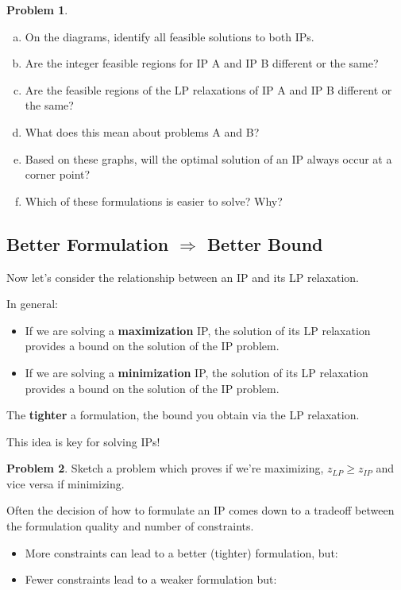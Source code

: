 \documentclass[11pt]{article}
\theoremstyle{definition}
\newtheorem{problem}{Problem}
\newcommand{\answerbox}[3]{%
  \fbox{%
    \begin{minipage}[#1]{#2}
      \hfill\vspace{#3}
    \end{minipage}
  }
}
\newcommand{\wordbox}{\answerbox{c}{1.2in}{.7cm}}
\begin{document}
\begin{problem}
\newpage

\begin{enumerate}[(a)]
   \item On the diagrams, identify all feasible solutions to both IPs. \vfill
   \item Are the integer feasible regions for IP A and IP B different or the same? \vfill
   \item Are the feasible regions of the LP relaxations of IP A and IP B different or the same? \vfill
   \item What does this mean about problems A and B? \vfill
   \item Based on these graphs, will the optimal solution of an IP always occur at a corner point? \vfill
   \item Which of these formulations is easier to solve? Why? \vfill

\end{enumerate}
\end{problem}

\newpage

\subsection{Better Formulation $\Rightarrow$ Better Bound}

Now let's consider the relationship between an IP and its LP relaxation.

\bigskip

In general:
	\begin{itemize}
	\item If we are solving a \textbf{maximization} IP, the solution of its LP relaxation provides a \wordbox bound on the solution of the IP problem.
	\item If we are solving a \textbf{minimization} IP, the solution of its LP relaxation provides a \wordbox bound on the solution of the IP problem.
	\end{itemize}

The \textbf{tighter} a formulation, the \wordbox bound you obtain via the LP relaxation.

\begin{tcolorbox}
This idea is key for solving IPs!
\end{tcolorbox}	
\begin{problem}
Sketch a problem which proves if we're maximizing, $z_{LP} \geq z_{IP}$ and vice versa if minimizing.
\end{problem}
\vfill

Often the decision of how to formulate an IP comes down to a tradeoff between the formulation quality and number of constraints.
\begin{itemize}
\item More constraints can lead to a better (tighter) formulation, but: \vspace{0.5in}
\item Fewer constraints lead to a weaker formulation but: \vspace{0.5in}
\end{itemize}	
\end{document}
